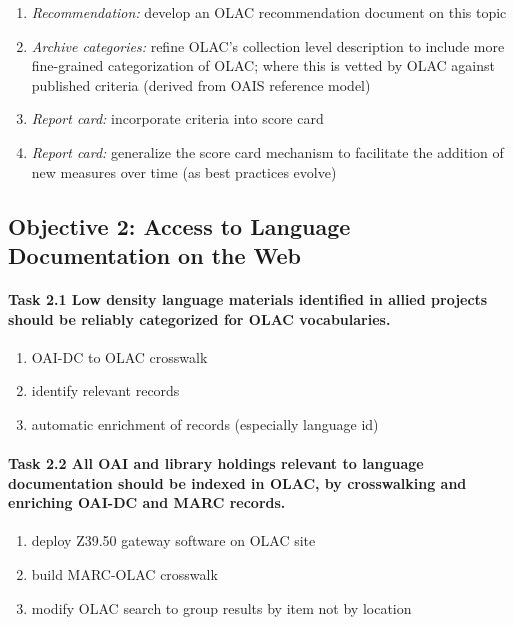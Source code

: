 \begin{enumerate}[label=\textit{\task\alph*}]
\item \textit{Recommendation:}
  develop an OLAC recommendation document on this topic
\item \textit{Archive categories:}
  refine OLAC's collection level description to include
  more fine-grained categorization of OLAC; where this is vetted
  by OLAC against published criteria (derived from OAIS reference model)
\item \textit{Report card:}
  incorporate criteria into score card
\item \textit{Report card:}
  generalize the score card mechanism to facilitate the addition
  of new measures over time (as best practices evolve)
\end{enumerate}

\subsection*{Objective 2: Access to Language Documentation on the Web}

\def\task{2.1}
\paragraph{Task {\task} Low density language materials identified in allied projects
      should be reliably categorized for OLAC vocabularies.}

\begin{enumerate}[label=\textit{\task\alph*}]
\item OAI-DC to OLAC crosswalk
\item identify relevant records
\item automatic enrichment of records (especially language id)
\end{enumerate}

\def\task{2.2}
\paragraph{Task {\task} All OAI and library holdings relevant to language
      documentation should be indexed in OLAC, by
      crosswalking and enriching OAI-DC and MARC records.}

\begin{enumerate}[label=\textit{\task\alph*}]
\item deploy Z39.50 gateway software on OLAC site
\item build MARC-OLAC crosswalk
\item modify OLAC search to group results by item not by location
\end{enumerate}


